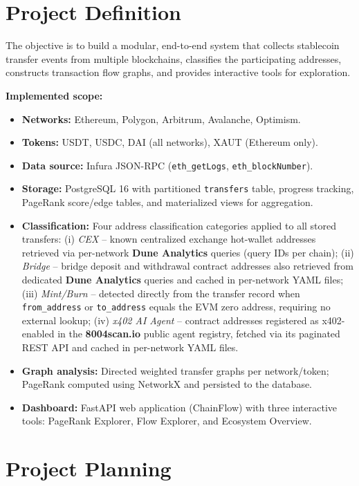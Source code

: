 \documentclass[a4paper,12pt]{report}
\begin{document}
\section{Project Definition}

The objective is to build a modular, end-to-end system that collects stablecoin transfer events
from multiple blockchains, classifies the participating addresses, constructs transaction flow
graphs, and provides interactive tools for exploration.

\textbf{Implemented scope:}
\begin{itemize}
\item \textbf{Networks:} Ethereum, Polygon, Arbitrum, Avalanche, Optimism.
\item \textbf{Tokens:} USDT, USDC, DAI (all networks), XAUT (Ethereum only).
\item \textbf{Data source:} Infura JSON-RPC (\texttt{eth\_getLogs}, \texttt{eth\_blockNumber}).
\item \textbf{Storage:} PostgreSQL 16 with partitioned \texttt{transfers} table, progress tracking,
PageRank score/edge tables, and materialized views for aggregation.
\item \textbf{Classification:} Four address classification categories applied to all stored
transfers: (i) \textit{CEX} -- known centralized exchange hot-wallet addresses retrieved via
per-network \textbf{Dune Analytics} queries (query IDs per chain); (ii) \textit{Bridge} --
bridge deposit and withdrawal contract addresses also retrieved from dedicated
\textbf{Dune Analytics} queries and cached in per-network YAML files; (iii) \textit{Mint/Burn}
-- detected directly from the transfer record when \texttt{from\_address} or \texttt{to\_address}
equals the EVM zero address, requiring no external lookup; (iv) \textit{x402 AI Agent} --
contract addresses registered as x402-enabled in the \textbf{8004scan.io} public agent
registry, fetched via its paginated REST API and cached in per-network YAML files.
\item \textbf{Graph analysis:} Directed weighted transfer graphs per network/token; PageRank
computed using NetworkX and persisted to the database.
\item \textbf{Dashboard:} FastAPI web application (ChainFlow) with three interactive tools:
PageRank Explorer, Flow Explorer, and Ecosystem Overview.
\end{itemize}

\section{Project Planning}
\end{document}
